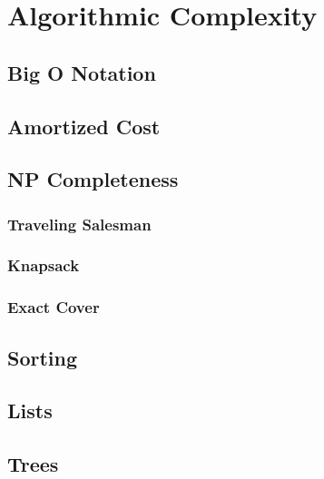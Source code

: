 \section{Algorithmic Complexity}

\subsection{Big O Notation}

\subsection{Amortized Cost}

\subsection{NP Completeness}

\subsubsection{Traveling Salesman}

\subsubsection{Knapsack}

\subsubsection{Exact Cover}


\subsection{Sorting}

\subsection{Lists}

\subsection{Trees}

